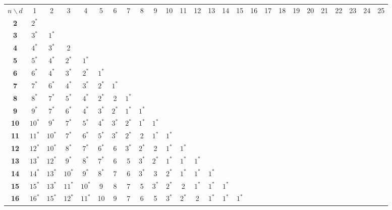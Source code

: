 
\begin{sidewaystable}
\smaller[2]
\centering
\setlength{\tabcolsep}{4.5pt}
\begin{tabular}{|c| c c c c c c c c c c c c c c c c c c c c c c c c c |}
\hline
$n \backslash  d$ & 1 & 2 & 3 & 4 & 5 & 6 & 7 & 8 & 9 & 10 & 11 & 12 & 13 & 14 & 15 & 16 & 17 & 18 & 19 & 20 & 21 & 22 & 23 & 24 & 25 \\
\Xhline{4\arrayrulewidth}
\textbf{2} & $2^*$ & & & & & & & & & & & & & & & & & & & & & & & & \\
\textbf{3} & $3^*$ & $1^*$ & & & & & & & & & & & & & & & & & & & & & & & \\
\textbf{4} & $4^*$ & $3^*$ & 2 & & & & & & & & & & & & & & & & & & & & & & \\
\textbf{5} & $5^*$ & $4^*$ & $2^*$ & $1^*$ & & & & & & & & & & & & & & & & & & & & & \\
\textbf{6} & $6^*$ & $4^*$ & $3^*$ & $2^*$ & $1^*$ & & & & & & & & & & & & & & & & & & & & \\
\textbf{7} & $7^*$ & $6^*$ & $4^*$ & $3^*$ & $2^*$ & $1^*$ & & & & & & & & & & & & & & & & & & & \\
\textbf{8} & $8^*$ & $7^*$ & $5^*$ & $4^*$ & $2^*$ & 2 & $1^*$ & & & & & & & & & & & & & & & & & & \\
\textbf{9} & $9^*$ & $7^*$ & $6^*$ & $4^*$ & $3^*$ & $2^*$ & $1^*$ & $1^*$ & & & & & & & & & & & & & & & & & \\
\textbf{10} & $10^*$ & $9^*$ & $7^*$ & $5^*$ & $4^*$ & $3^*$ & $2^*$ & $1^*$ & $1^*$ & & & & & & & & & & & & & & & & \\
\textbf{11} & $11^*$ & $10^*$ & $7^*$ & $6^*$ & $5^*$ & $3^*$ & $2^*$ & 2 & $1^*$ & $1^*$ & & & & & & & & & & & & & & & \\
\textbf{12} & $12^*$ & $10^*$ & $8^*$ & $7^*$ & $6^*$ & 6 & $3^*$ & $2^*$ & 2 & $1^*$ & $1^*$ & & & & & & & & & & & & & & \\
\textbf{13} & $13^*$ & $12^*$ & $9^*$ & $8^*$ & $7^*$ & 6 & 5 & $3^*$ & $2^*$ & $1^*$ & $1^*$ & $1^*$ & & & & & & & & & & & & & \\
\textbf{14} & $14^*$ & $13^*$ & $10^*$ & $9^*$ & $8^*$ & 7 & 6 & $3^*$ & 3 & $2^*$ & $1^*$ & $1^*$ & $1^*$ & & & & & & & & & & & & \\
\textbf{15} & $15^*$ & $13^*$ & $11^*$ & $10^*$ & 9 & 8 & 7 & 5 & $3^*$ & $2^*$ & 2 & $1^*$ & $1^*$ & $1^*$ & & & & & & & & & & & \\
\textbf{16} & $16^*$ & $15^*$ & $12^*$ & $11^*$ & 10 & 9 & 7 & 6 & 5 & $3^*$ & $2^*$ & 2 & $1^*$ & $1^*$ & $1^*$ & & & & & & & & & & \\

\end{tabular}
\end{sidewaystable}
